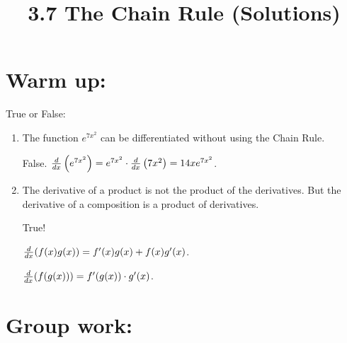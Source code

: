 \documentclass[nooutcomes]{ximera}
\title{3.7 The Chain Rule (Solutions)}
\begin{document}
\begin{abstract}		\end{abstract}
\maketitle

\section*{Warm up:} 
True or False:
	\begin{enumerate}[label=\Roman*.]
	
	\item  The function $e^{7x^2}$ can be differentiated without using the Chain Rule.
		\begin{freeResponse}
		False.  $\frac{d}{dx} \left( e^{7x^2} \right) = e^{7x^2} \cdot \frac{d}{dx} \left( 7x^2 \right) = 14x e^{7x^2}$.  
		\end{freeResponse}	
		
	\item  The derivative of a product is not the product of the derivatives.  But the derivative of a composition is a product of derivatives.
		\begin{freeResponse}
		True!
		
		$\frac{d}{dx} (f(x) g(x)) = f'(x) g(x) + f(x) g'(x)$.
		
		$\frac{d}{dx}(f(g(x))) = f'(g(x)) \cdot g'(x)$.
		\end{freeResponse}	
		
	\end{enumerate}
	
	
	
	
	

\section*{Group work:}
\end{document}
